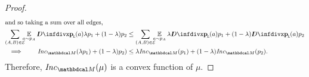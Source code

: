 \begin{proof}
\begin{align*}
\intertext{and so taking a sum over all edges, }
					\sum_{(A, B) \in \Ed}\mskip-10mu\E_{a\sim p_A} \kldiv{\bp(a) }{\lambda p_1 + (1-\lambda) p_2} 
			&\leq \sum_{(A, B) \in
							  \Ed}\mskip-10mu\E_{a\sim p_A}\lambda
							\kldiv{\bp(a)}{p_1} + (1-\lambda)
							\kldiv{\bp(a)}{p_2} \\
	\implies\qquad
		\Inc_{\dg M}( \lambda p_1) + (1-\lambda)p_2)
					&\leq \lambda \Inc_{\dg M}(p_1) + (1-\lambda)
					\Inc_{\dg M}(p_2). 
				\end{align*}
	Therefore, $\Inc_{\dg M}( \mu)$ is a convex function of $\mu$.
\end{proof}

